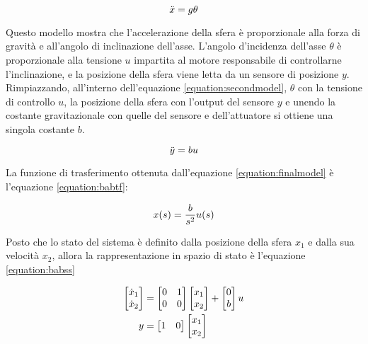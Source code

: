 \begin{equation}
	\centering
	\ddot{x} = g\theta
	\label{equation:secondmodel}
\end{equation}

Questo modello mostra che l'accelerazione della sfera è proporzionale alla forza di gravità e all'angolo di inclinazione dell'asse. L'angolo d'incidenza dell'asse $\theta$ è proporzionale alla tensione $u$ impartita al motore responsabile di controllarne l'inclinazione, e la posizione della sfera viene letta da un sensore di posizione $y$. Rimpiazzando, all'interno dell'equazione \ref{equation:secondmodel}, $\theta$ con la tensione di controllo $u$, la posizione della sfera con l'output del sensore $y$ e unendo la costante gravitazionale con quelle del sensore e dell'attuatore si ottiene una singola costante $b$.

\begin{equation}
\centering
\ddot{y} = bu
\label{equation:finalmodel}
\end{equation}

\newpage
La funzione di trasferimento ottenuta dall'equazione \ref{equation:finalmodel} è l'equazione \ref{equation:babtf}:

\begin{equation}
\centering
x(s) = \frac{b}{s^{2}}u(s)
\label{equation:babtf}
\end{equation}

Posto che lo stato del sistema è definito dalla posizione della sfera $x_{1}$ e dalla sua velocità $x_{2}$, allora la rappresentazione in spazio di stato è l'equazione \ref{equation:babss}

\begin{align}
	\centering
	\begin{bmatrix}
		\dot{x}_{1} \\ \dot{x}_{2}
	\end{bmatrix}
	&= 
	\begin{bmatrix}
		0 & 1 \\ 0 & 0
	\end{bmatrix}
	\begin{bmatrix}
		x_{1} \\ x_{2}
	\end{bmatrix}
	+
	\begin{bmatrix}
		0 \\ b
	\end{bmatrix}u \nonumber
	\\
	y &=
	\begin{bmatrix}
		1 & 0
	\end{bmatrix}
	\begin{bmatrix}
		x_{1} \\ x_{2}
	\end{bmatrix}
	\label{equation:babss}
\end{align}

